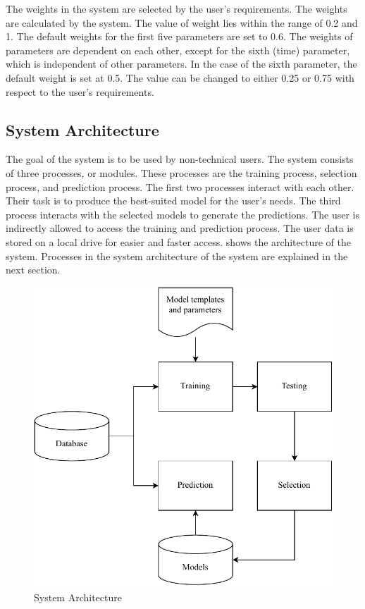 \documentclass[a4paper,fleqn]{cas-dc}
\begin{document}
The weights in the system are selected by the user's requirements. The weights are calculated by the system. The value of weight lies within the range of 0.2 and 1. The default weights for the first five parameters are set to 0.6. The weights of parameters are dependent on each other, except for the sixth (time) parameter, which is independent of other parameters. In the case of the sixth parameter, the default weight is set at 0.5. The value can be changed to either 0.25 or 0.75 with respect to the user's requirements.

\subsection{System Architecture}\label{subsec:system_architecture}

The goal of the system is to be used by non-technical users. The system consists of three processes, or modules. These processes are the training process, selection process, and prediction process. The first two processes interact with each other. Their task is to produce the best-suited model for the user's needs. The third process interacts with the selected models to generate the predictions. The user is indirectly allowed to access the training and prediction process. The user data is stored on a local drive for easier and faster access.  shows the architecture of the system. Processes in the system architecture of the system are explained in the next section.

\begin{figure}[ht]
    \centering
    \includegraphics[width=0.9\columnwidth]{system_architecture.pdf}
    \caption{System Architecture}
    \label{fig:system_architecture}
\end{figure}
\end{document}
